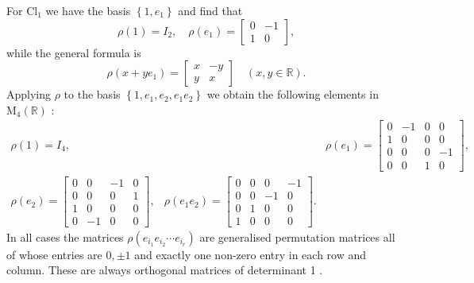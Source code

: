\documentclass[10pt, letterpaper]{article}
\begin{document}
For $\mathrm{Cl}_{1}$ we have the basis $\left\{1, e_{1}\right\}$ and find that
$$
\rho(1)=I_{2}, \quad \rho\left(e_{1}\right)=\left[\begin{array}{rr}
0 & -1 \\
1 & 0
\end{array}\right],
$$
while the general formula is
$$
\rho\left(x+y e_{1}\right)=\left[\begin{array}{rr}
x & -y \\
y & x
\end{array}\right] \quad(x, y \in \mathbb{R}) .
$$
Applying $\rho$ to the basis $\left\{1, e_{1}, e_{2}, e_{1} e_{2}\right\}$ we obtain the following elements in $\mathrm{M}_{4}(\mathbb{R})$ :
$$
\begin{array}{lrl}
\rho(1)=I_{4}, & & \rho\left(e_{1}\right)=\left[\begin{array}{rrrr}
0 & -1 & 0 & 0 \\
1 & 0 & 0 & 0 \\
0 & 0 & 0 & -1 \\
0 & 0 & 1 & 0
\end{array}\right], \\
\rho\left(e_{2}\right)=\left[\begin{array}{rrrr}
0 & 0 & -1 & 0 \\
0 & 0 & 0 & 1 \\
1 & 0 & 0 & 0 \\
0 & -1 & 0 & 0
\end{array}\right], & \rho\left(e_{1} e_{2}\right)=\left[\begin{array}{rrrr}
0 & 0 & 0 & -1 \\
0 & 0 & -1 & 0 \\
0 & 1 & 0 & 0 \\
1 & 0 & 0 & 0
\end{array}\right] .
\end{array}
$$
In all cases the matrices $\rho\left(e_{i_{1}} e_{i_{2}} \cdots e_{i_{r}}\right)$ are generalised permutation matrices all of whose entries are $0, \pm 1$ and exactly one non-zero entry in each row and column. These are always orthogonal matrices of determinant 1 .
\end{document}
